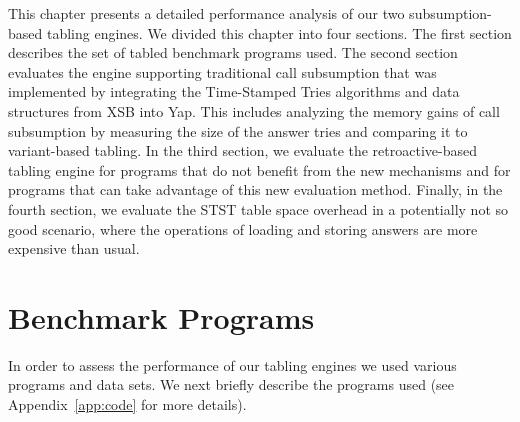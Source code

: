 This chapter presents a detailed performance analysis of our two subsumption-based tabling engines.
We divided this chapter into four sections. The first section describes the
set of tabled benchmark programs used. The second
section evaluates the engine supporting traditional call subsumption that was implemented by integrating the
Time-Stamped Tries algorithms and data structures from XSB into Yap. This includes analyzing the memory gains
of call subsumption by measuring the size of the answer tries and comparing it to variant-based tabling.
In the third section, we evaluate the retroactive-based tabling engine for programs that do not benefit
from the new mechanisms and for programs that can take advantage of this new evaluation method. Finally,
in the fourth section, we evaluate the STST table space overhead in a potentially not so good scenario,
where the operations of loading and storing answers are more expensive than usual.

\section{Benchmark Programs}

In order to assess the performance of our tabling engines we used various programs and data sets.
We next briefly describe the programs used (see Appendix~\ref{app:code} for more details).

